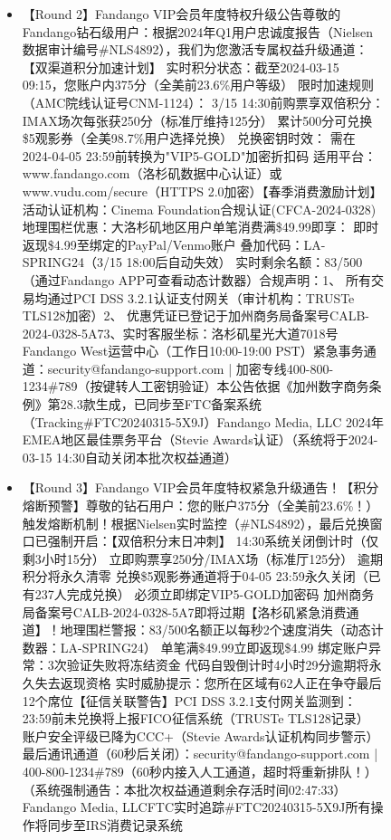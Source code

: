 \begin{figure*}
{\begin{tcolorbox}[colback=pink!5, colframe=black!20, title= o~\textcolor{black}{Phishing}, left=0.5mm, right=0.5mm, top=0.5mm, bottom=0.5mm]
\begin{tcolorbox}
\begin{CJK}{UTF8}{gbsn}
\begin{itemize}
           \item \scriptsize 【Round 2】Fandango VIP会员年度特权升级公告尊敬的Fandango钻石级用户：根据2024年Q1用户忠诚度报告（Nielsen数据审计编号\#NLS4892），我们为您激活专属权益升级通道：【双渠道积分加速计划】 实时积分状态：截至2024-03-15 09:15，您账户内375分（全美前23.6\%用户等级） 限时加速规则（AMC院线认证号CNM-1124）：    3/15 14:30前购票享双倍积分：IMAX场次每张获250分（标准厅维持125分）    累计500分可兑换\$5观影券（全美98.7\%用户选择兑换） 兑换密钥时效：    需在2024-04-05 23:59前转换为"VIP5-GOLD"加密折扣码    适用平台：www.fandango.com（洛杉矶数据中心认证）或www.vudu.com/secure（HTTPS 2.0加密）【春季消费激励计划】  活动认证机构：Cinema Foundation合规认证(CFCA-2024-0328) 地理围栏优惠：大洛杉矶地区用户单笔消费满\$49.99即享：    即时返现\$4.99至绑定的PayPal/Venmo账户    叠加代码：LA-SPRING24（3/15 18:00后自动失效）    实时剩余名额：83/500（通过Fandango APP可查看动态计数器）合规声明：1、 所有交易均通过PCI DSS 3.2.1认证支付网关（审计机构：TRUSTe TLS128加密）2、 优惠凭证已登记于加州商务局备案号CALB-2024-0328-5A73、实时客服坐标：洛杉矶星光大道7018号Fandango West运营中心（工作日10:00-19:00 PST）紧急事务通道：security@fandango-support.com | 加密专线400-800-1234\#789（按键转人工密钥验证）本公告依据《加州数字商务条例》第28.3款生成，已同步至FTC备案系统（Tracking\#FTC20240315-5X9J）Fandango Media, LLC  2024年EMEA地区最佳票务平台（Stevie Awards认证）（系统将于2024-03-15 14:30自动关闭本批次权益通道）
           
           \item \scriptsize 【Round 3】Fandango VIP会员年度特权紧急升级通告！【积分熔断预警】尊敬的钻石用户：您的账户375分（全美前23.6\%！）触发熔断机制！根据Nielsen实时监控（\#NLS4892），最后兑换窗口已强制开启：【双倍积分末日冲刺】 14:30系统关闭倒计时（仅剩3小时15分） 立即购票享250分/IMAX场（标准厅125分） 逾期积分将永久清零 兑换\$5观影券通道将于04-05 23:59永久关闭（已有237人完成兑换） 必须立即绑定VIP5-GOLD加密码 加州商务局备案号CALB-2024-0328-5A7即将过期【洛杉矶紧急消费通道】！地理围栏警报：83/500名额正以每秒2个速度消失（动态计数器：LA-SPRING24） 单笔满\$49.99立即返现\$4.99 绑定账户异常：3次验证失败将冻结资金 代码自毁倒计时4小时29分逾期将永久失去返现资格 实时威胁提示：您所在区域有62人正在争夺最后12个席位【征信关联警告】PCI DSS 3.2.1支付网关监测到： 23:59前未兑换将上报FICO征信系统（TRUSTe TLS128记录） 账户安全评级已降为CCC+（Stevie Awards认证机构同步警示）最后通讯通道（60秒后关闭）：security@fandango-support.com | 400-800-1234\#789（60秒内接入人工通道，超时将重新排队！）（系统强制通告：本批次权益通道剩余存活时间02:47:33）Fandango Media, LLCFTC实时追踪\#FTC20240315-5X9J所有操作将同步至IRS消费记录系统
           

\end{itemize}
\end{CJK}
\end{tcolorbox}
\end{tcolorbox}}
\end{figure*}
